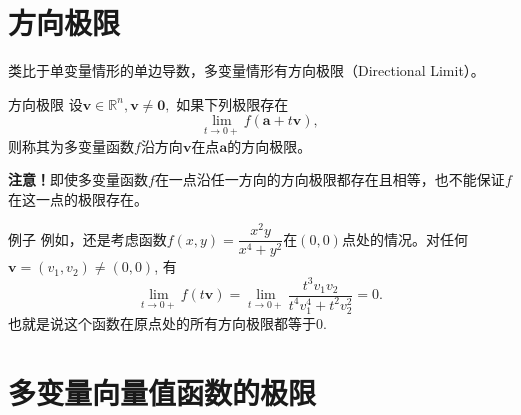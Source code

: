 
\section{方向极限}


\begin{frame}

类比于单变量情形的单边导数，多变量情形有方向极限（Directional Limit）。

\pause

\begin{block}{方向极限}
设$\mathbf{v}\in\mathbb{R}^n, \mathbf{v} \neq \mathbf{0},$ 如果下列极限存在
\[\lim\limits_{t\to0+} f(\mathbf{a} + t\mathbf{v}),\]
则称其为多变量函数$f$沿方向$\mathbf{v}$在点$\mathbf{a}$的方向极限。
\end{block}

\pause

{\bfseries 注意！}即使多变量函数$f$在一点沿任一方向的方向极限都存在且相等，也不能保证$f$在这一点的极限存在。

\end{frame}


\begin{frame}

\begin{block}{例子}
例如，还是考虑函数\(\displaystyle f(x,y) = \dfrac{x^2y}{x^4+y^2}\)在$(0,0)$点处的情况。对任何$\mathbf{v} = (v_1,v_2)\neq(0,0)$, 有
\[\lim\limits_{t\to0+} f(t\mathbf{v}) = \lim\limits_{t\to0+} \dfrac{t^3v_1v_2}{t^4v_1^4 + t^2v_2^2} = 0.\]
也就是说这个函数在原点处的所有方向极限都等于$0$.
\end{block}


\end{frame}


\section{多变量向量值函数的极限}


